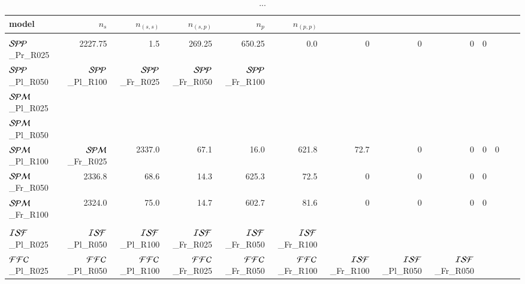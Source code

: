 \documentclass[aa]{lib/aa}
\begin{document}
\begin{table}
 \caption{...}
 \label{Tab:model_PP}
 \centering 
 \begin{tabular}{lrrrrrrrrrrrr}
   \hline\hline
   model & $n_{s}$ & $n_{(s,s)}$ & $n_{(s,p)}$ & $n_{p}$ & $n_{(p,p)}$ \\
        \hline \vspace{-0.75em}\\
${\cal SPP}$\_Pr\_R025 & 2227.75 & 1.5 & 269.25 & 650.25 & 0.0 & 0 & 0 & 0 & 0 \\
${\cal SPP}$\_Pl\_R050 & 
${\cal SPP}$\_Pl\_R100 & 
${\cal SPP}$\_Fr\_R025 & 
${\cal SPP}$\_Fr\_R050 & 
${\cal SPP}$\_Fr\_R100 & 

 \hline
  \hline \vspace{-0.75em}\\
${\cal SPM}$\_Pl\_R025 & \\
${\cal SPM}$\_Pl\_R050 & \\
${\cal SPM}$\_Pl\_R100 & 
${\cal SPM}$\_Fr\_R025 & 2337.0 & 67.1 & 16.0 & 621.8 & 72.7 & 0 & 0 & 0 & 0 \\
${\cal SPM}$\_Fr\_R050 & 2336.8 & 68.6 & 14.3 & 625.3 & 72.5 & 0 & 0 & 0 & 0 \\
${\cal SPM}$\_Fr\_R100 & 2324.0 & 75.0 & 14.7 & 602.7 & 81.6 & 0 & 0 & 0 & 0 \\


  \hline
  \hline \vspace{-0.75em}\\
${\cal ISF}$\_Pl\_R025 & 
${\cal ISF}$\_Pl\_R050 & 
${\cal ISF}$\_Pl\_R100 & 
${\cal ISF}$\_Fr\_R025 & 
${\cal ISF}$\_Fr\_R050 & 
${\cal ISF}$\_Fr\_R100 & 

  \hline
  \hline \vspace{-0.75em}\\
${\cal FFC}$\_Pl\_R025 & 
${\cal FFC}$\_Pl\_R050 & 
${\cal FFC}$\_Pl\_R100 & 
${\cal FFC}$\_Fr\_R025 & 
${\cal FFC}$\_Fr\_R050 & 
${\cal FFC}$\_Fr\_R100 & 
  \hline
  \hline
${\cal ISF}$\_Fr\_R100 & 
${\cal ISF}$\_Pl\_R050 & 
${\cal ISF}$\_Fr\_R050 & 
  \hline
 \end{tabular}
\end{table}
\end{document}
